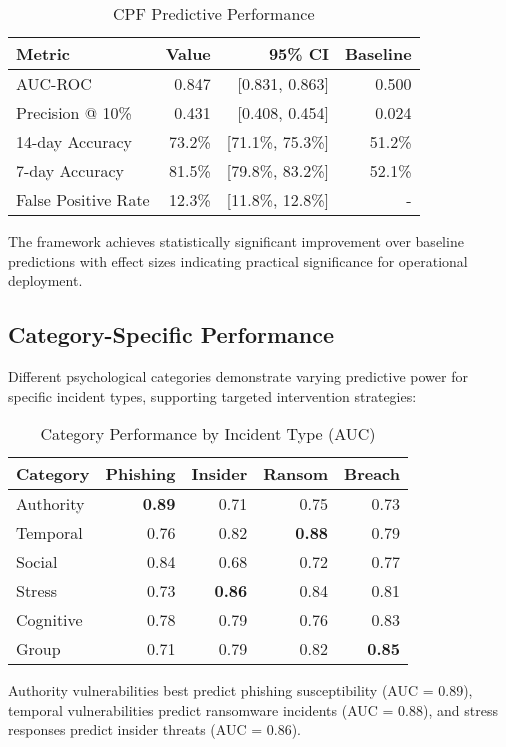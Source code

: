 \documentclass[10pt,twocolumn]{IEEEtran}
\begin{document}
\begin{table}[h]
\caption{CPF Predictive Performance}
\label{tab:performance}
\centering
\begin{tabular}{@{}lrrr@{}}
\toprule
Metric & Value & 95\% CI & Baseline \\
\midrule
AUC-ROC & 0.847 & [0.831, 0.863] & 0.500 \\
Precision @ 10\% & 0.431 & [0.408, 0.454] & 0.024 \\
14-day Accuracy & 73.2\% & [71.1\%, 75.3\%] & 51.2\% \\
7-day Accuracy & 81.5\% & [79.8\%, 83.2\%] & 52.1\% \\
False Positive Rate & 12.3\% & [11.8\%, 12.8\%] & - \\
\bottomrule
\end{tabular}
\end{table}

The framework achieves statistically significant improvement over baseline predictions with effect sizes indicating practical significance for operational deployment.

\subsection{Category-Specific Performance}

Different psychological categories demonstrate varying predictive power for specific incident types, supporting targeted intervention strategies:

\begin{table}[h]
\caption{Category Performance by Incident Type (AUC)}
\label{tab:category}
\centering
\begin{tabular}{@{}lrrrr@{}}
\toprule
Category & Phishing & Insider & Ransom & Breach \\
\midrule
Authority & \textbf{0.89} & 0.71 & 0.75 & 0.73 \\
Temporal & 0.76 & 0.82 & \textbf{0.88} & 0.79 \\
Social & 0.84 & 0.68 & 0.72 & 0.77 \\
Stress & 0.73 & \textbf{0.86} & 0.84 & 0.81 \\
Cognitive & 0.78 & 0.79 & 0.76 & 0.83 \\
Group & 0.71 & 0.79 & 0.82 & \textbf{0.85} \\
\bottomrule
\end{tabular}
\end{table}

Authority vulnerabilities best predict phishing susceptibility (AUC = 0.89), temporal vulnerabilities predict ransomware incidents (AUC = 0.88), and stress responses predict insider threats (AUC = 0.86).
\end{document}
